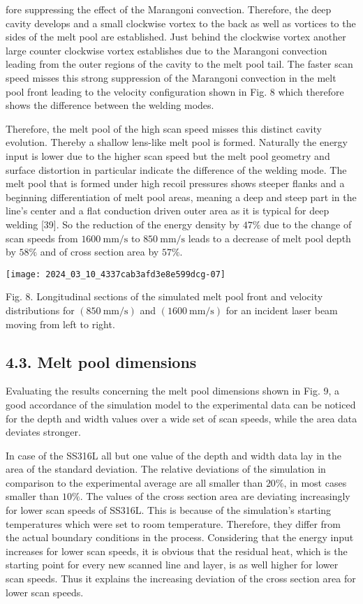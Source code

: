 \documentclass[10pt]{article}
\begin{document}
fore suppressing the effect of the Marangoni convection. Therefore, the deep cavity develops and a small clockwise vortex to the back as well as vortices to the sides of the melt pool are established. Just behind the clockwise vortex another large counter clockwise vortex establishes due to the Marangoni convection leading from the outer regions of the cavity to the melt pool tail. The faster scan speed misses this strong suppression of the Marangoni convection in the melt pool front leading to the velocity configuration shown in Fig. 8 which therefore shows the difference between the welding modes.

Therefore, the melt pool of the high scan speed misses this distinct cavity evolution. Thereby a shallow lens-like melt pool is formed. Naturally the energy input is lower due to the higher scan speed but the melt pool geometry and surface distortion in particular indicate the difference of the welding mode. The melt pool that is formed under high recoil pressures shows steeper flanks and a beginning differentiation of melt pool areas, meaning a deep and steep part in the line's center and a flat conduction driven outer area as it is typical for deep welding [39]. So the reduction of the energy density by $47 \%$ due to the change of scan speeds from $1600 \mathrm{~mm} / \mathrm{s}$ to $850 \mathrm{~mm} / \mathrm{s}$ leads to a decrease of melt pool depth by $58 \%$ and of cross section area by $57 \%$.

\begin{center}
\texttt{[image: 2024\_03\_10\_4337cab3afd3e8e599dcg-07]}
\end{center}

Fig. 8. Longitudinal sections of the simulated melt pool front and velocity distributions for $(850 \mathrm{~mm} / \mathrm{s})$ and $(1600 \mathrm{~mm} / \mathrm{s})$ for an incident laser beam moving from left to right.

\subsection*{4.3. Melt pool dimensions}
Evaluating the results concerning the melt pool dimensions shown in Fig. 9, a good accordance of the simulation model to the experimental data can be noticed for the depth and width values over a wide set of scan speeds, while the area data deviates stronger.

In case of the SS316L all but one value of the depth and width data lay in the area of the standard deviation. The relative deviations of the simulation in comparison to the experimental average are all smaller than $20 \%$, in most cases smaller than $10 \%$. The values of the cross section area are deviating increasingly for lower scan speeds of SS316L. This is because of the simulation's starting temperatures which were set to room temperature. Therefore, they differ from the actual boundary conditions in the process. Considering that the energy input increases for lower scan speeds, it is obvious that the residual heat, which is the starting point for every new scanned line and layer, is as well higher for lower scan speeds. Thus it explains the increasing deviation of the cross section area for lower scan speeds.
\end{document}
